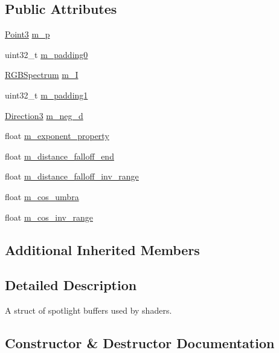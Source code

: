 \subsection*{Public Attributes}
\begin{DoxyCompactItemize}
\item 
\hyperlink{structmage_1_1_point3}{Point3} \hyperlink{structmage_1_1_spot_light_buffer_a6cb32b6089b90aa937df99bb794884e3}{m\+\_\+p}
\item 
uint32\+\_\+t \hyperlink{structmage_1_1_spot_light_buffer_a8a5110d1427ca192cee7751ae8aeabab}{m\+\_\+padding0}
\item 
\hyperlink{structmage_1_1_r_g_b_spectrum}{R\+G\+B\+Spectrum} \hyperlink{structmage_1_1_spot_light_buffer_a778a729e75ff4074fc5aede42f551ab2}{m\+\_\+I}
\item 
uint32\+\_\+t \hyperlink{structmage_1_1_spot_light_buffer_a60369775901f4536a28cc35ab2275bd8}{m\+\_\+padding1}
\item 
\hyperlink{structmage_1_1_direction3}{Direction3} \hyperlink{structmage_1_1_spot_light_buffer_ae0baddd8256464e3cdf91a766f9bf143}{m\+\_\+neg\+\_\+d}
\item 
float \hyperlink{structmage_1_1_spot_light_buffer_a272cd27ceece27883b9607b8fff2160c}{m\+\_\+exponent\+\_\+property}
\item 
float \hyperlink{structmage_1_1_spot_light_buffer_ae49f16cc01db734c72f02c963d89d0c2}{m\+\_\+distance\+\_\+falloff\+\_\+end}
\item 
float \hyperlink{structmage_1_1_spot_light_buffer_a3958077ae1acf0c1a5ca82711cb2d689}{m\+\_\+distance\+\_\+falloff\+\_\+inv\+\_\+range}
\item 
float \hyperlink{structmage_1_1_spot_light_buffer_a7a7a02e7ddfaf96c90395cd21a6c0a91}{m\+\_\+cos\+\_\+umbra}
\item 
float \hyperlink{structmage_1_1_spot_light_buffer_a4d230438193aa7e99457f63863632f00}{m\+\_\+cos\+\_\+inv\+\_\+range}
\end{DoxyCompactItemize}
\subsection*{Additional Inherited Members}


\subsection{Detailed Description}
A struct of spotlight buffers used by shaders. 

\subsection{Constructor \& Destructor Documentation}
\hypertarget{structmage_1_1_spot_light_buffer_a862141be0a9dfe1fd3117141924650d5}{}\label{structmage_1_1_spot_light_buffer_a862141be0a9dfe1fd3117141924650d5} 
